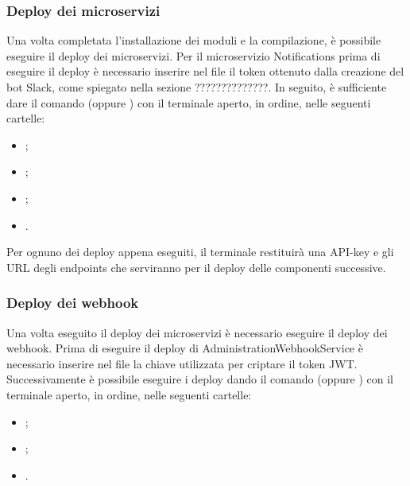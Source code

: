 \subsubsection{Deploy dei microservizi}
Una volta completata l'installazione dei moduli e la compilazione, è possibile eseguire il deploy dei microservizi. Per il microservizio Notifications prima di eseguire il deploy è necessario inserire nel file  il token ottenuto dalla creazione del bot Slack, come spiegato nella sezione ??????????????.
In seguito, è sufficiente dare il comando  (oppure ) con il terminale aperto, in ordine, nelle seguenti cartelle:
\begin{itemize}
	\item {};
	\item {};
	\item {};
	\item {}.
\end{itemize}
Per ognuno dei deploy appena eseguiti, il terminale restituirà una API-key e gli URL degli endpoints che serviranno per il deploy delle componenti successive.

\subsubsection{Deploy dei webhook}
Una volta eseguito il deploy dei microservizi è necessario eseguire il deploy dei webhook. Prima di eseguire il deploy di AdministrationWebhookService è necessario  inserire nel file  la chiave utilizzata per criptare il token JWT. Successivamente è possibile eseguire i deploy dando il comando  (oppure ) con il terminale aperto, in ordine, nelle seguenti cartelle:
\begin{itemize}
	\item {};
	\item {};
	\item {}.
\end{itemize}

